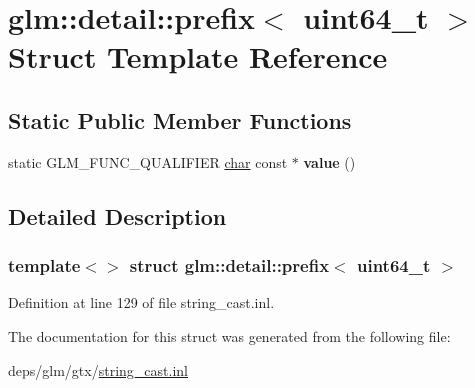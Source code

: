 \hypertarget{structglm_1_1detail_1_1prefix_3_01uint64__t_01_4}{}\section{glm\+:\+:detail\+:\+:prefix$<$ uint64\+\_\+t $>$ Struct Template Reference}
\label{structglm_1_1detail_1_1prefix_3_01uint64__t_01_4}
\subsection*{Static Public Member Functions}
\begin{DoxyCompactItemize}
\item 
\mbox{\label{structglm_1_1detail_1_1prefix_3_01uint64__t_01_4_a70571c67b5d9aadad2b0d3ea937fa392}} 
static G\+L\+M\+\_\+\+F\+U\+N\+C\+\_\+\+Q\+U\+A\+L\+I\+F\+I\+ER \hyperlink{classchar}{char} const  $\ast$ {\bfseries value} ()
\end{DoxyCompactItemize}


\subsection{Detailed Description}
\subsubsection*{template$<$$>$\newline
struct glm\+::detail\+::prefix$<$ uint64\+\_\+t $>$}



Definition at line 129 of file string\+\_\+cast.\+inl.



The documentation for this struct was generated from the following file\+:\begin{DoxyCompactItemize}
\item 
deps/glm/gtx/\hyperlink{string__cast_8inl}{string\+\_\+cast.\+inl}\end{DoxyCompactItemize}
